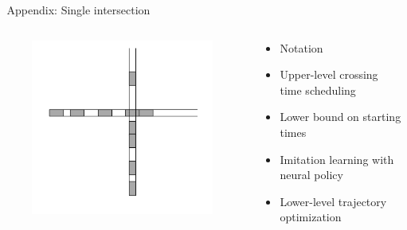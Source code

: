 \documentclass[bigger]{beamer}
\begin{document}
\begin{frame}[label={sec:orgaf3d34f}]{\(\;\)}
\centering
\color{structure}
\Large Appendix: Single intersection
\normalsize
\vspace{2em}

\begin{columns}
\begin{column}{0.35\textwidth}
\begin{figure}
  \centering
  \includegraphics[width=1.0\textwidth]{../figures/single_intersection_example.png}
\end{figure}
\end{column}

\begin{column}{0.65\textwidth}
\begin{itemize}

\item Notation
\item Upper-level crossing time scheduling
\item Lower bound on starting times
\item Imitation learning with neural policy
\item Lower-level trajectory optimization

\end{itemize}
\end{column}
\end{columns}
\end{frame}
\end{document}
